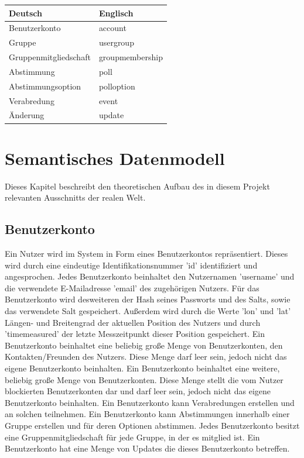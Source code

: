 \documentclass[parskip=full,11pt]{scrartcl}
\begin{document}
\begin{tabular}[t]{ l l }
    \textbf{Deutsch} & \textbf{Englisch}\\
    \hline
    Benutzerkonto & account\\
    Gruppe & usergroup\\
		Gruppenmitgliedschaft & groupmembership\\
		Abstimmung & poll\\
		Abstimmungsoption & polloption\\
		Verabredung & event\\
        Änderung & update\\


\end{tabular}

\pagebreak

\section{Semantisches Datenmodell}
Dieses Kapitel beschreibt den theoretischen Aufbau des in diesem Projekt
relevanten Ausschnitts der realen Welt.

\subsection{Benutzerkonto}
Ein Nutzer wird im System in Form eines Benutzerkontos repräsentiert.
Dieses wird durch eine eindeutige Identifikationsnummer 'id' identifiziert und
angesprochen. Jedes Benutzerkonto beinhaltet den Nutzernamen 'username' und
die verwendete E-Mailadresse 'email' des zugehörigen Nutzers.
Für das Benutzerkonto wird desweiteren der Hash seines Passworts und des Salts,
sowie das verwendete Salt gespeichert.
Außerdem wird durch die Werte 'lon' und 'lat' Längen- und Breitengrad der
aktuellen Position des Nutzers und durch 'timemeasured' der letzte
Messzeitpunkt dieser Position gespeichert.
Ein Benutzerkonto beinhaltet eine beliebig große Menge von Benutzerkonten,
den Kontakten/Freunden des Nutzers. Diese Menge darf leer sein, jedoch nicht
das eigene Benutzerkonto beinhalten.
Ein Benutzerkonto beinhaltet eine weitere,
beliebig große Menge von Benutzerkonten.
Diese Menge stellt die vom Nutzer blockierten Benutzerkonten dar und darf leer
sein, jedoch nicht das eigene Benutzerkonto beinhalten. Ein Benutzerkonto kann
Verabredungen erstellen und an solchen teilnehmen.
Ein Benutzerkonto kann Abstimmungen innerhalb einer Gruppe erstellen und für
deren Optionen abstimmen.
Jedes Benutzerkonto besitzt eine Gruppenmitgliedschaft für jede Gruppe, in der
es mitglied ist.
Ein Benutzerkonto hat eine Menge von Updates die dieses Benutzerkonto
betreffen.
\end{document}
